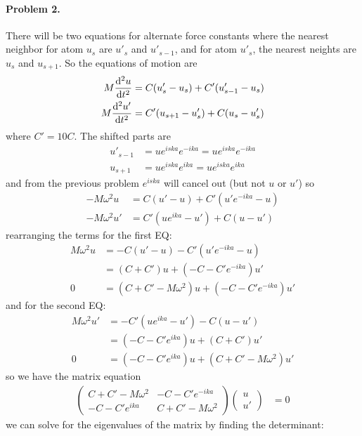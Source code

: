 \documentclass[../main.tex]{subfiles}
\begin{document}
\paragraph*{Problem 2.} There will be two equations for alternate force constants where
the nearest neighbor for atom $u_s$ are $u'_{s}$ and $u'_{s-1}$,
and for atom $u'_s$, the nearest neights are $u_{s}$ and $u_{s+1}$. So the equations of motion are
\begin{align*}
    M \dv[2]{u}{t} &= C(u'_s - u_s) + C'(u'_{s - 1} - u_s) \\
    M \dv[2]{u'}{t} &= C' (u_{s+1} - u'_s) + C(u_{s} - u'_s)
\end{align*}
where $C' = 10 C$. The shifted parts are 
\begin{align*}
    u'_{s-1} &= u e^{iska}e^{-ika} = ue^{iska}e^{-ika} \\
    u_{s+1} &= ue^{iska}e^{ika} = ue^{iska}e^{ika}
\end{align*}
and from the previous problem $e^{iska}$ will cancel out (but not $u$ or $u'$) so 
\begin{align*}
    -M \omega^2 u &= C(u' - u) + C'(u'e^{-ika} - u) \\
    -M \omega^2 u' &= C'(ue^{ika} - u') + C(u - u')
\end{align*}
rearranging the terms for the first EQ:
\begin{align*}
    M \omega^2 u &= -C(u' - u) - C'(u'e^{-ika} - u) \\
    &= (C + C')u + (-C - C'e^{-ika})u' \\
    0&= (C + C' - M\omega^2)u + (-C - C'e^{-ika})u'
\end{align*}
and for the second EQ:
\begin{align*}
    M \omega^2 u' &= -C'(ue^{ika} - u') - C(u - u') \\
    &= (-C - C' e^{ika})u + (C + C')u' \\
    0 &= (-C - C'e^{ika})u + (C + C' - M\omega^2)u'
\end{align*}
so we have the matrix equation
\begin{align*}
    \begin{pmatrix}
        C + C' - M\omega^2 & -C - C'e^{-ika} \\
        -C - C'e^{ika} & C + C' - M\omega^2
    \end{pmatrix}
    \begin{pmatrix}
        u \\ u'
    \end{pmatrix}
    &= 0
\end{align*}
we can solve for the eigenvalues of the matrix by finding the determinant: 
\end{document}
